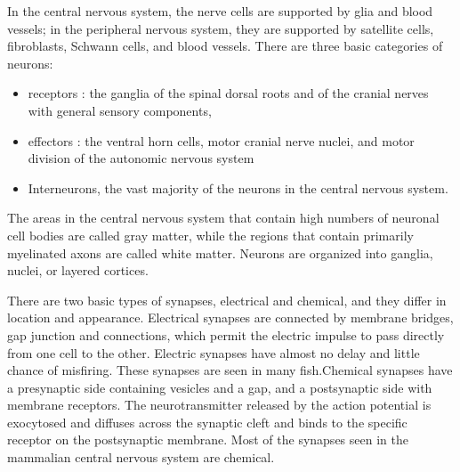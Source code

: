 In the central nervous system, the nerve cells are supported by glia and blood vessels;
in the peripheral nervous system, they are supported by satellite cells, fibroblasts,
Schwann cells, and blood vessels.
There are three basic categories of neurons:
\begin{itemize}
	\item receptors : the ganglia of the spinal dorsal roots and of the cranial nerves
		with general sensory components,
	\item effectors : the ventral horn cells, motor cranial nerve nuclei, and motor division of
		the autonomic nervous system
	\item Interneurons, the vast majority of the neurons in the central nervous system.
\end{itemize}
The areas in the central nervous system that contain high numbers of neuronal cell bodies are
called gray matter, while the regions that contain primarily myelinated axons are called
white matter. Neurons are organized into ganglia, nuclei, or layered cortices.

There are two basic types of synapses, electrical and chemical, and they differ in location and 
appearance. Electrical synapses are connected by membrane bridges, gap junction and connections,
which permit the electric impulse to pass directly from one cell to the other.
Electric synapses have almost no delay and little chance of misfiring. These synapses are seen in 
many fish.Chemical synapses have a presynaptic side containing vesicles and a gap,
and a postsynaptic side with membrane receptors.
The neurotransmitter released by the action potential is exocytosed and diffuses across the 
synaptic cleft and binds to the specific receptor on the postsynaptic membrane.
Most of the synapses seen in the mammalian central nervous system are chemical.

